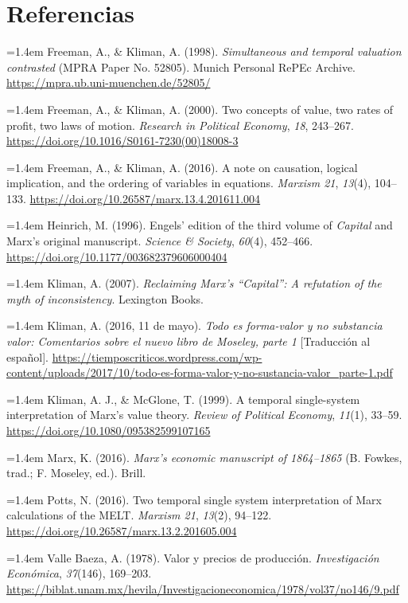 \documentclass[10pt,twoside]{article}
\begin{document}
\section*{Referencias}
\begingroup\small
\setlength{\parindent}{0pt}\setlength{\parskip}{.65em}
\newcommand{\bibentry}[1]{\par\hangindent=1.4em #1\par}
\bibentry{Freeman, A., \& Kliman, A. (1998). \emph{Simultaneous and temporal valuation contrasted} (MPRA Paper No. 52805). Munich Personal RePEc Archive. \url{https://mpra.ub.uni-muenchen.de/52805/}}
\bibentry{Freeman, A., \& Kliman, A. (2000). Two concepts of value, two rates of profit, two laws of motion. \emph{Research in Political Economy}, \emph{18}, 243--267. \url{https://doi.org/10.1016/S0161-7230(00)18008-3}}
\bibentry{Freeman, A., \& Kliman, A. (2016). A note on causation, logical implication, and the ordering of variables in equations. \emph{Marxism 21}, \emph{13}(4), 104--133. \url{https://doi.org/10.26587/marx.13.4.201611.004}}
\bibentry{Heinrich, M. (1996). Engels' edition of the third volume of \emph{Capital} and Marx's original manuscript. \emph{Science \& Society}, \emph{60}(4), 452--466. \url{https://doi.org/10.1177/003682379606000404}}
\bibentry{Kliman, A. (2007). \emph{Reclaiming Marx's ``Capital'': A refutation of the myth of inconsistency}. Lexington Books.}
\bibentry{Kliman, A. (2016, 11 de mayo). \emph{Todo es forma-valor y no substancia valor: Comentarios sobre el nuevo libro de Moseley, parte 1} [Traducción al español]. \url{https://tiemposcriticos.wordpress.com/wp-content/uploads/2017/10/todo-es-forma-valor-y-no-sustancia-valor_parte-1.pdf}}
\bibentry{Kliman, A. J., \& McGlone, T. (1999). A temporal single-system interpretation of Marx's value theory. \emph{Review of Political Economy}, \emph{11}(1), 33--59. \url{https://doi.org/10.1080/095382599107165}}
\bibentry{Marx, K. (2016). \emph{Marx's economic manuscript of 1864--1865} (B. Fowkes, trad.; F. Moseley, ed.). Brill.}
\bibentry{Potts, N. (2016). Two temporal single system interpretation of Marx calculations of the MELT. \emph{Marxism 21}, \emph{13}(2), 94--122. \url{https://doi.org/10.26587/marx.13.2.201605.004}}
\bibentry{Valle Baeza, A. (1978). Valor y precios de producción. \emph{Investigación Económica}, \emph{37}(146), 169--203. \url{https://biblat.unam.mx/hevila/Investigacioneconomica/1978/vol37/no146/9.pdf}}
\endgroup
\clearpage
\thispagestyle{empty}
\vspace*{25mm}
\end{document}
